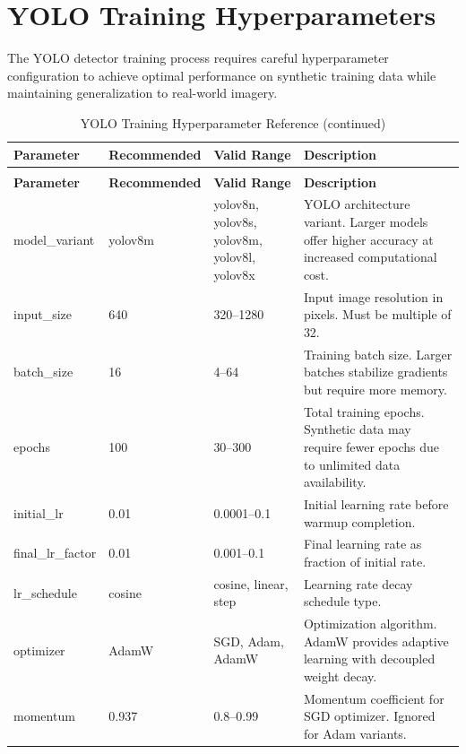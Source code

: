 \section{YOLO Training Hyperparameters}
\label{sec:yolo_hyperparams}

The YOLO detector training process requires careful hyperparameter configuration to achieve optimal performance on synthetic training data while maintaining generalization to real-world imagery.

\begin{longtable}{p{3.5cm}p{2cm}p{2.5cm}p{5.5cm}}
\caption{YOLO Training Hyperparameter Reference} \label{tab:yolo_training} \\
\toprule
\textbf{Parameter} & \textbf{Recommended} & \textbf{Valid Range} & \textbf{Description} \\
\midrule
\endfirsthead
\caption[]{YOLO Training Hyperparameter Reference (continued)} \\
\toprule
\textbf{Parameter} & \textbf{Recommended} & \textbf{Valid Range} & \textbf{Description} \\
\midrule
\endhead
\bottomrule
\endfoot
\bottomrule
\endlastfoot
model\_variant & yolov8m & yolov8n, yolov8s, yolov8m, yolov8l, yolov8x & YOLO architecture variant. Larger models offer higher accuracy at increased computational cost. \\
\addlinespace
input\_size & 640 & 320--1280 & Input image resolution in pixels. Must be multiple of 32. \\
\addlinespace
batch\_size & 16 & 4--64 & Training batch size. Larger batches stabilize gradients but require more memory. \\
\addlinespace
epochs & 100 & 30--300 & Total training epochs. Synthetic data may require fewer epochs due to unlimited data availability. \\
\addlinespace
initial\_lr & 0.01 & 0.0001--0.1 & Initial learning rate before warmup completion. \\
\addlinespace
final\_lr\_factor & 0.01 & 0.001--0.1 & Final learning rate as fraction of initial rate. \\
\addlinespace
lr\_schedule & cosine & cosine, linear, step & Learning rate decay schedule type. \\
\addlinespace
optimizer & AdamW & SGD, Adam, AdamW & Optimization algorithm. AdamW provides adaptive learning with decoupled weight decay. \\
\addlinespace
momentum & 0.937 & 0.8--0.99 & Momentum coefficient for SGD optimizer. Ignored for Adam variants. \\

\end{longtable}
